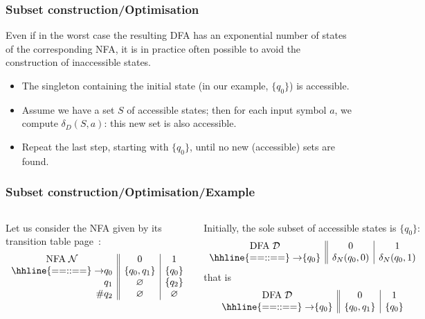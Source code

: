 % 
\begin{frame}
\frametitle{Subset construction/Optimisation}

Even if in the worst case the resulting DFA has an exponential number
of states of the corresponding NFA, it is in practice often possible
to avoid the construction of inaccessible states.
\begin{itemize}

  \item The singleton containing the initial state (in our example,
  \(\{q_0\}\)) is accessible.

  \item Assume we have a set \(S\) of accessible states; then for
  each input symbol \(a\), we compute \(\delta_D(S,a)\): this new set
  is also accessible.

  \item Repeat the last step, starting with \(\{q_0\}\), until no
  new (accessible) sets are found.

\end{itemize}

\end{frame}

% 
\begin{frame}
\frametitle{Subset construction/Optimisation/Example}

\begin{columns}

   Let us consider the NFA given by its
  transition table page~\pageref{nfa_01_suffix_table}:
  \[
  \begin{array}{r@{}l||c|c}
    \multicolumn{2}{c||}{\text{NFA} \; {\cal N}} & 0 & 1\\
    \hhline{==::==}
    \rightarrow & q_0 & \{q_0, q_1\} & \{q_0\}\\
                & q_1 & \varnothing  & \{q_2\}\\
    \#          & q_2 & \varnothing  & \varnothing
  \end{array}
  \]
  
   Initially, the sole subset of accessible
  states is \(\{q_0\}\):
  \[
  \begin{array}{r@{}l||c|c}
    \multicolumn{2}{c||}{\text{DFA} \; {\cal D}} & 0 & 1\\
    \hhline{==::==}
    \rightarrow & \{q_0\} & \delta_N(q_0,0) & \delta_N(q_0,1)
  \end{array}
  \]
  that is
  \[
  \begin{array}{r@{}l||c|c}
    \multicolumn{2}{c||}{\text{DFA} \; {\cal D}} & 0 & 1\\
    \hhline{==::==}
    \rightarrow & \{q_0\} & \{q_0,q_1\} & \{q_0\}
  \end{array}
  \]
\end{columns}

\end{frame}

